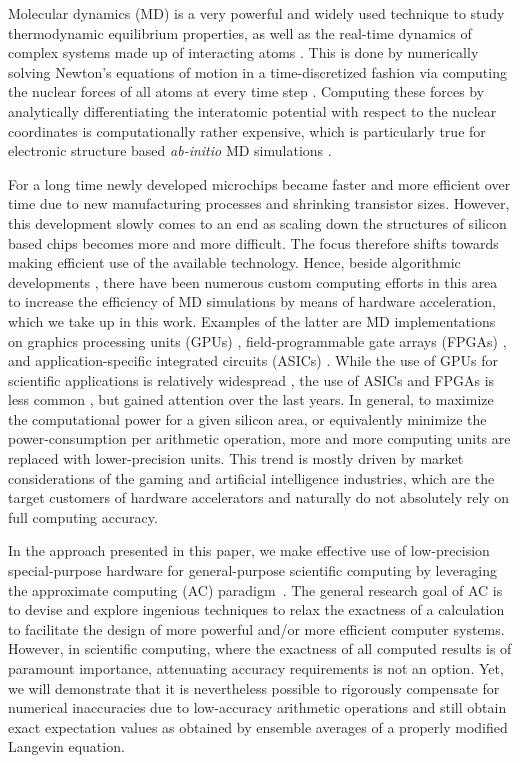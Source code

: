 \documentclass[preprint]{elsarticle}
\begin{document}
Molecular dynamics (MD) is a very powerful and widely used technique to study thermodynamic equilibrium properties, as well as the real-time dynamics of complex systems made up of interacting atoms \cite{AlderWainwright1957}. This is done by numerically solving Newton's equations of motion in a time-discretized fashion via computing the nuclear forces of all atoms at every time step \cite{RahmanMD}. Computing these forces by analytically differentiating the interatomic potential with respect to the nuclear coordinates is computationally rather expensive, which is particularly true for electronic structure based \textit{ab-initio} MD simulations \cite{CPMD, CPMD_TDK, PayneRMP, WIRES_TDK}.

For a long time newly developed microchips became faster and more efficient over time due to new manufacturing processes and shrinking transistor sizes. However, this development slowly comes to an end as scaling down the structures of silicon based chips becomes more and more difficult. The focus therefore shifts towards making efficient use of the available technology. Hence, beside algorithmic developments \cite{MTS, Snir, GSE, Shaw, VerletCell, pSHAKE, John, Prodan}, there have been numerous custom computing efforts in this area to increase the efficiency of MD simulations by means of hardware acceleration, which we take up in this work. Examples of the latter are MD implementations on graphics processing units (GPUs) \cite{HOOMD, NAMD, OpenMM, HalMD, Lammps, Amber, Gromacs}, field-programmable gate arrays (FPGAs) \cite{HerbordtI, HerbordtII}, and application-specific integrated circuits (ASICs) \cite{AntonI, AntonII}.
While the use of GPUs for scientific applications is relatively widespread \cite{GPUcomp,Binder,Weigel}, the use of ASICs \cite{QCDScience, QCDOC, GrapeScience, Grape} and FPGAs is less common \cite{JanusI, JanusII, Convey, FDTD, Kenter, Galerkin}, but gained attention over the last years.
In general, to maximize the computational power for a given silicon area, or equivalently minimize the power-consumption per arithmetic operation, more and more computing units are replaced with lower-precision units. This trend is mostly driven by market considerations of the gaming and artificial intelligence industries, which are the target customers of hardware accelerators and naturally do not absolutely rely on full computing accuracy.


In the approach presented in this paper, we make effective use of low-precision special-purpose hardware for general-purpose scientific computing by leveraging the approximate computing (AC) paradigm~\cite{KlavikMalossiBekasEtAl2014, PlesslAC}. The general research goal of AC is to devise and explore ingenious techniques to relax the exactness of a calculation to facilitate the design of more powerful and/or more efficient computer systems. However, in scientific computing, where the exactness of all computed results is of paramount importance, attenuating accuracy requirements is not an option. Yet, we will demonstrate that it is nevertheless possible to rigorously compensate for numerical inaccuracies due to low-accuracy arithmetic operations and still obtain exact expectation values as obtained by ensemble averages of a properly modified Langevin equation.
\end{document}
